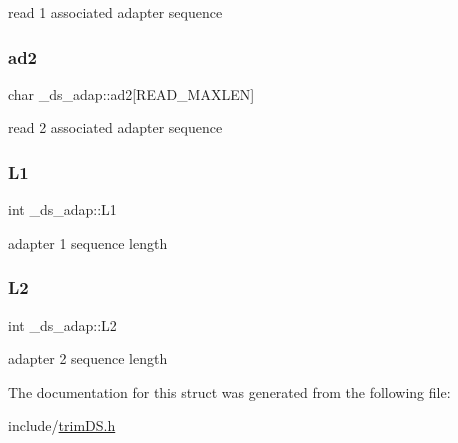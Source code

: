 read 1 associated adapter sequence \mbox{\label{struct__ds__adap_a6206cafdf0cfea58ce84c08515def558}} 
\subsubsection{\texorpdfstring{ad2}{ad2}}
{\footnotesize\ttfamily char \+\_\+ds\+\_\+adap\+::ad2\mbox{[}R\+E\+A\+D\+\_\+\+M\+A\+X\+L\+EN\mbox{]}}

read 2 associated adapter sequence \mbox{\label{struct__ds__adap_a57266ed9fb1b73a20f98b8df2235f0c8}} 
\subsubsection{\texorpdfstring{L1}{L1}}
{\footnotesize\ttfamily int \+\_\+ds\+\_\+adap\+::\+L1}

adapter 1 sequence length \mbox{\label{struct__ds__adap_a80926b243dd1120a43bd9b8e00774b99}} 
\subsubsection{\texorpdfstring{L2}{L2}}
{\footnotesize\ttfamily int \+\_\+ds\+\_\+adap\+::\+L2}

adapter 2 sequence length 

The documentation for this struct was generated from the following file\+:\begin{DoxyCompactItemize}
\item 
include/\mbox{\hyperlink{trimDS_8h}{trim\+D\+S.\+h}}\end{DoxyCompactItemize}
